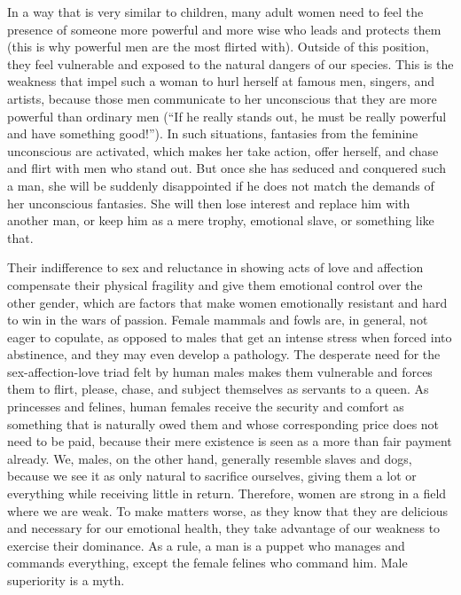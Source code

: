 \par In a way that is very similar to children, many adult women need to feel the presence of someone more powerful and more wise who leads and protects them (this is why powerful men are the most flirted with). Outside of this position, they feel vulnerable and exposed to the natural dangers of our species. This is the weakness that impel such a woman to hurl herself at famous men, singers, and artists, because those men communicate to her unconscious that they are more powerful than ordinary men (\enquote{If he really stands out, he must be really powerful and have something good!}). In such situations, fantasies from the feminine unconscious are activated, which makes her take action, offer herself, and chase and flirt with men who stand out. But once she has seduced and conquered such a man, she will be suddenly disappointed if he does not match the demands of her unconscious fantasies. She will then lose interest and replace him with another man, or keep him as a mere trophy, emotional slave, or something like that.

\par Their indifference to sex and reluctance in showing acts of love and affection compensate their physical fragility and give them emotional control over the other gender, which are factors that make women emotionally resistant and hard to win in the wars of passion. Female mammals and fowls are, in general, not eager to copulate, as opposed to males that get an intense stress when forced into abstinence, and they may even develop a pathology. The desperate need for the sex-affection-love triad felt by human males makes them vulnerable and forces them to flirt, please, chase, and subject themselves as servants to a queen. As princesses and felines, human females receive the security and comfort as something that is naturally owed them and whose corresponding price does not need to be paid, because their mere existence is seen as a more than fair payment already. We, males, on the other hand, generally resemble slaves and dogs, because we see it as only natural to sacrifice ourselves, giving them a lot or everything while receiving little in return. Therefore, women are strong in a field where we are weak. To make matters worse, as they know that they are delicious and necessary for our emotional health, they take advantage of our weakness to exercise their dominance. As a rule, a man is a puppet who manages and commands everything, except the female felines who command him. Male superiority is a myth.

